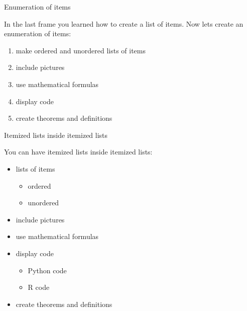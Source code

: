 
\begin{frame}{Enumeration of items}

In the last frame you learned how to create a list of items. Now lets create an enumeration of items:

\begin{enumerate}

\item make ordered and unordered lists of items
\item include pictures
\item use mathematical formulas
\item display code
\item create theorems and definitions

\end{enumerate}

\end{frame}


\begin{frame}{Itemized lists inside itemized lists}

You can have itemized lists inside itemized lists:

\begin{itemize}

\item lists of items

\begin{itemize}
\item ordered
\item unordered
\end{itemize}

\item include pictures
\item use mathematical formulas
\item display code

\begin{itemize}
\item Python code
\item R code
\end{itemize}

\item create theorems and definitions

\end{itemize}

\end{frame}


